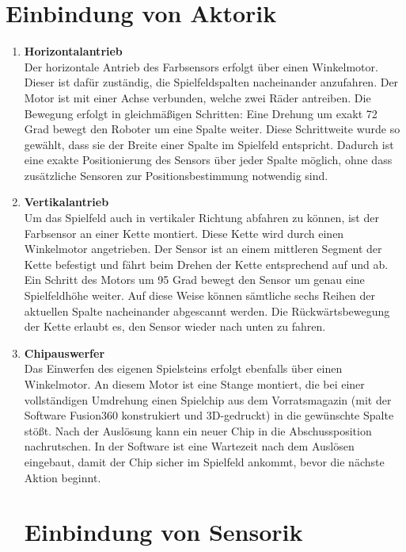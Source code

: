 \section{Einbindung von Aktorik}
\begin{enumerate}
	\item \textbf{Horizontalantrieb}\\
	Der horizontale Antrieb des Farbsensors erfolgt über einen Winkelmotor. Dieser ist dafür zuständig, die Spielfeldspalten nacheinander anzufahren. Der Motor ist mit einer Achse verbunden, welche zwei Räder antreiben. Die Bewegung erfolgt in gleichmäßigen Schritten: Eine Drehung um exakt 72 Grad bewegt den Roboter um eine Spalte weiter. Diese Schrittweite wurde so gewählt, dass sie der Breite einer Spalte im Spielfeld entspricht. Dadurch ist eine exakte Positionierung des Sensors über jeder Spalte möglich, ohne dass zusätzliche Sensoren zur Positionsbestimmung notwendig sind. 
	\item \textbf{Vertikalantrieb}\\
	 Um das Spielfeld auch in vertikaler Richtung abfahren zu können, ist der Farbsensor an einer Kette montiert. Diese Kette wird durch einen Winkelmotor angetrieben. Der Sensor ist an einem mittleren Segment der Kette befestigt und fährt beim Drehen der Kette entsprechend auf und ab. Ein Schritt des Motors um 95 Grad bewegt den Sensor um genau eine Spielfeldhöhe weiter. Auf diese Weise können sämtliche sechs Reihen der aktuellen Spalte nacheinander abgescannt werden. Die Rückwärtsbewegung der Kette erlaubt es, den Sensor wieder nach unten zu fahren.
	\item \textbf{Chipauswerfer}\\
	Das Einwerfen des eigenen Spielsteins erfolgt ebenfalls über einen Winkelmotor. An diesem Motor ist eine Stange montiert, die bei einer vollständigen Umdrehung einen Spielchip aus dem Vorratsmagazin (mit der Software Fusion360 konstrukiert und 3D-gedruckt) in die gewünschte Spalte stößt. Nach der Auslösung kann ein neuer Chip in die Abschussposition nachrutschen. In der Software ist eine Wartezeit nach dem Auslösen eingebaut, damit der Chip sicher im Spielfeld ankommt, bevor die nächste Aktion beginnt.


\section{Einbindung von Sensorik}


\end{enumerate}
